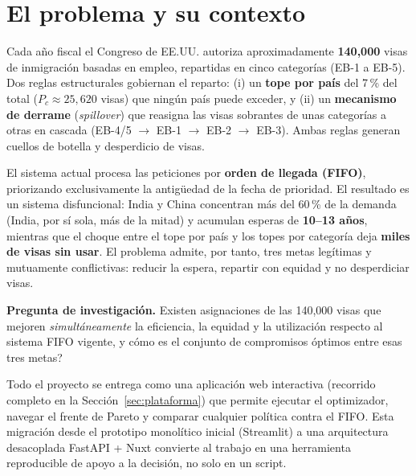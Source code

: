 \documentclass[11pt,letterpaper]{article}
\begin{document}
\newpage
\begingroup
\setlength{\parskip}{0pt}
\linespread{1.0}\selectfont
\small\tableofcontents
\endgroup

\section{El problema y su contexto}
\label{sec:problema}

Cada año fiscal el Congreso de EE.UU. autoriza aproximadamente \textbf{140{,}000} visas de inmigración basadas en empleo, repartidas en cinco categorías (EB-1 a EB-5). Dos reglas estructurales gobiernan el reparto: (i) un \textbf{tope por país} del 7\,\% del total ($P_c \approx 25{,}620$ visas) que ningún país puede exceder, y (ii) un \textbf{mecanismo de derrame} (\textit{spillover}) que reasigna las visas sobrantes de unas categorías a otras en cascada (EB-4/5 $\to$ EB-1 $\to$ EB-2 $\to$ EB-3). Ambas reglas generan cuellos de botella y desperdicio de visas.

El sistema actual procesa las peticiones por \textbf{orden de llegada (FIFO)}, priorizando exclusivamente la antigüedad de la fecha de prioridad. El resultado es un sistema disfuncional: India y China concentran más del 60\,\% de la demanda (India, por sí sola, más de la mitad) y acumulan esperas de \textbf{10--13 años}, mientras que el choque entre el tope por país y los topes por categoría deja \textbf{miles de visas sin usar}. El problema admite, por tanto, tres metas legítimas y mutuamente conflictivas: reducir la espera, repartir con equidad y no desperdiciar visas.

\begin{notebox}
\textbf{Pregunta de investigación.} \textquestiondown{}Existen asignaciones de las 140{,}000 visas que mejoren \emph{simultáneamente} la eficiencia, la equidad y la utilización respecto al sistema FIFO vigente, y cómo es el conjunto de compromisos óptimos entre esas tres metas?
\end{notebox}

Todo el proyecto se entrega como una aplicación web interactiva (recorrido completo en la Sección~\ref{sec:plataforma}) que permite ejecutar el optimizador, navegar el frente de Pareto y comparar cualquier política contra el FIFO. Esta migración desde el prototipo monolítico inicial (Streamlit) a una arquitectura desacoplada FastAPI + Nuxt convierte al trabajo en una herramienta reproducible de apoyo a la decisión, no solo en un script.
\end{document}
